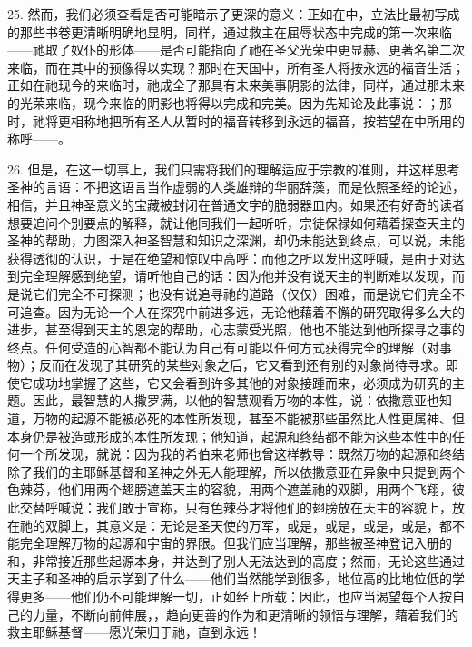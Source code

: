 25. 然而，我们必须查看是否可能暗示了更深的意义：正如在中，立法比最初写成的那些书卷更清晰明确地显明，同样，通过救主在屈辱状态中完成的第一次来临——祂取了奴仆的形体——是否可能指向了祂在圣父光荣中更显赫、更著名第二次来临，而在其中的预像得以实现？那时在天国中，所有圣人将按永远的福音生活；正如在祂现今的来临时，祂成全了那具有未来美事阴影的法律，同样，通过那未来的光荣来临，现今来临的阴影也将得以完成和完美。因为先知论及此事说：；那时，祂将更相称地把所有圣人从暂时的福音转移到永远的福音，按若望在中所用的称呼——。\par

26. 但是，在这一切事上，我们只需将我们的理解适应于宗教的准则，并这样思考圣神的言语：不把这语言当作虚弱的人类雄辩的华丽辞藻，而是依照圣经的论述，相信，并且神圣意义的宝藏被封闭在普通文字的脆弱器皿内。如果还有好奇的读者想要追问个别要点的解释，就让他同我们一起听听，宗徒保禄如何藉着探查天主的圣神的帮助，力图深入神圣智慧和知识之深渊，却仍未能达到终点，可以说，未能获得透彻的认识，于是在绝望和惊叹中高呼：而他之所以发出这呼喊，是由于对达到完全理解感到绝望，请听他自己的话：因为他并没有说天主的判断难以发现，而是说它们完全不可探测；也没有说追寻祂的道路（仅仅）困难，而是说它们完全不可追查。因为无论一个人在探究中前进多远，无论他藉着不懈的研究取得多么大的进步，甚至得到天主的恩宠的帮助，心志蒙受光照，他也不能达到他所探寻之事的终点。任何受造的心智都不能认为自己有可能以任何方式获得完全的理解（对事物）；反而在发现了其研究的某些对象之后，它又看到还有别的对象尚待寻求。即使它成功地掌握了这些，它又会看到许多其他的对象接踵而来，必须成为研究的主题。因此，最智慧的人撒罗满，以他的智慧观看万物的本性，说：依撒意亚也知道，万物的起源不能被必死的本性所发现，甚至不能被那些虽然比人性更属神、但本身仍是被造或形成的本性所发现；他知道，起源和终结都不能为这些本性中的任何一个所发现，就说：因为我的希伯来老师也曾这样教导：既然万物的起源和终结除了我们的主耶稣基督和圣神之外无人能理解，所以依撒意亚在异象中只提到两个色辣芬，他们用两个翅膀遮盖天主的容貌，用两个遮盖祂的双脚，用两个飞翔，彼此交替呼喊说：我们敢于宣称，只有色辣芬才将他们的翅膀放在天主的容貌上，放在祂的双脚上，其意义是：无论是圣天使的万军，或是，或是，或是，或是，都不能完全理解万物的起源和宇宙的界限。但我们应当理解，那些被圣神登记入册的和，非常接近那些起源本身，并达到了别人无法达到的高度；然而，无论这些通过天主子和圣神的启示学到了什么——他们当然能学到很多，地位高的比地位低的学得更多——他们仍不可能理解一切，正如经上所载：因此，也应当渴望每个人按自己的力量，不断向前伸展，，趋向更善的作为和更清晰的领悟与理解，藉着我们的救主耶稣基督——愿光荣归于祂，直到永远！\par

